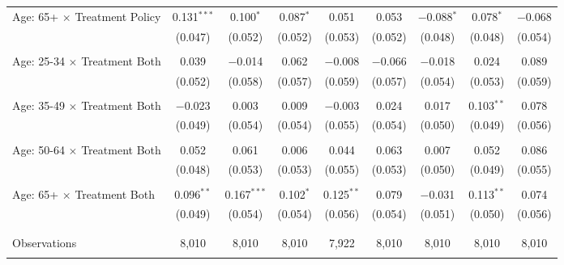\begin{tabular}{@{\extracolsep{5pt}}lcccccccc}
 Age: 65+ $\times$ Treatment Policy & 0.131$^{***}$ & 0.100$^{*}$ & 0.087$^{*}$ & 0.051 & 0.053 & $-$0.088$^{*}$ & 0.078$^{*}$ & $-$0.068 \\ 
  & (0.047) & (0.052) & (0.052) & (0.053) & (0.052) & (0.048) & (0.048) & (0.054) \\ 
  & & & & & & & & \\ 
 Age: 25-34 $\times$ Treatment Both & 0.039 & $-$0.014 & 0.062 & $-$0.008 & $-$0.066 & $-$0.018 & 0.024 & 0.089 \\ 
  & (0.052) & (0.058) & (0.057) & (0.059) & (0.057) & (0.054) & (0.053) & (0.059) \\ 
  & & & & & & & & \\ 
 Age: 35-49 $\times$ Treatment Both & $-$0.023 & 0.003 & 0.009 & $-$0.003 & 0.024 & 0.017 & 0.103$^{**}$ & 0.078 \\ 
  & (0.049) & (0.054) & (0.054) & (0.055) & (0.054) & (0.050) & (0.049) & (0.056) \\ 
  & & & & & & & & \\ 
 Age: 50-64 $\times$ Treatment Both & 0.052 & 0.061 & 0.006 & 0.044 & 0.063 & 0.007 & 0.052 & 0.086 \\ 
  & (0.048) & (0.053) & (0.053) & (0.055) & (0.053) & (0.050) & (0.049) & (0.055) \\ 
  & & & & & & & & \\ 
 Age: 65+ $\times$ Treatment Both & 0.096$^{**}$ & 0.167$^{***}$ & 0.102$^{*}$ & 0.125$^{**}$ & 0.079 & $-$0.031 & 0.113$^{**}$ & 0.074 \\ 
  & (0.049) & (0.054) & (0.054) & (0.056) & (0.054) & (0.051) & (0.050) & (0.056) \\ 
  & & & & & & & & \\ 
\hline \\[-1.8ex] 

Observations & 8,010 & 8,010 & 8,010 & 7,922 & 8,010 & 8,010 & 8,010 & 8,010 \\ 
\hline 
\hline \\[-1.8ex] 
\end{tabular} 